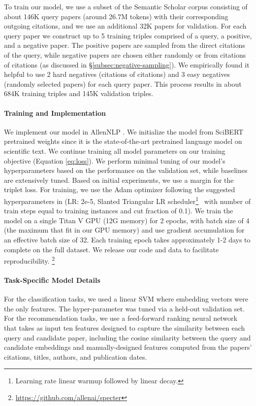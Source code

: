 To train our model, we use a subset of the Semantic Scholar corpus \cite{Ammar2018ConstructionOT} consisting of about 146K query papers (around 26.7M tokens) with their corresponding outgoing citations, and we use an additional 32K papers for validation.
For each query paper we construct up to 5 training triples comprised of a query, a positive, and a negative paper. The positive papers are sampled from the direct citations of the query, while negative papers are chosen either randomly or from citations of citations (as discussed in \S\ref{subsec:negative-sampling}). We empirically found it helpful to use 2 hard negatives (citations of citations) and 3 easy negatives (randomly selected papers) for each query paper. This process results in about 684K training triples and 145K validation triples.

\paragraph{Training and Implementation}
We implement our model in AllenNLP \cite{gardner-etal-2018-allennlp}. We initialize the model from SciBERT pretrained weights \cite{Beltagy2019SciBERT} since it is the state-of-the-art pretrained language model on scientific text. We continue training all model parameters on our training objective (Equation \ref{eq:loss}). We perform minimal tuning of our model's hyperparameters based on the performance on the validation set, while baselines are extensively tuned. Based on initial experiments, we use a margin  for the triplet loss. For training, we use the Adam optimizer \cite{Kingma2014AdamAM} following the suggested hyperparameters in \citet{Devlin2018BERTPO} (LR: 2e-5, Slanted Triangular LR scheduler\footnote{Learning rate linear warmup followed by linear decay.}~\cite{howard-ruder-2018-universal} with number of train steps equal to training instances and cut fraction of 0.1). We train the model on a single Titan V GPU (12G memory) for 2 epochs, with batch size of 4 (the maximum that fit in our GPU memory) and use gradient accumulation for an effective batch size of 32. Each training epoch takes approximately 1-2 days to complete on the full dataset. We release our code and data to facilitate reproducibility.
\footnote{\url{https://github.com/allenai/specter}}

\paragraph{Task-Specific Model Details}
For the classification tasks, we used a linear SVM  where embedding vectors were the only features. The  hyper-parameter was tuned via a held-out validation set.  For the recommendation tasks, we use a feed-forward ranking neural network that takes as input ten features designed to capture the similarity between each query and candidate paper, including the cosine similarity between the query and candidate embeddings and manually-designed features computed from the papers' citations, titles, authors, and publication dates.



